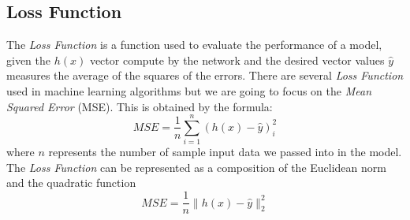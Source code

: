 \subsection{Loss Function}
\label{Loss:Mse}
The \textit{Loss Function} is a function used to evaluate the performance of a model, given the $h(x)$ vector compute by the network and the desired vector values $\widehat{y}$ measures the average of the squares of the errors. There are several \textit{Loss Function} used in machine learning algorithms but we are going to focus on the \textit{Mean Squared Error} (MSE). This is obtained by the formula: 	
\begin{equation}
MSE = \frac{1}{n} \sum_{i=1}^n (h(x) - \widehat{y})_{i}^2
\end{equation}
where $n$ represents the number of sample input data we passed into in the model. 
The \textit{Loss Function} can be represented as a composition of the Euclidean norm and the quadratic function
\begin{equation}
MSE = \frac{1}{n} \parallel h(x) - \widehat{y} \parallel_{2}^2  
\end{equation}

